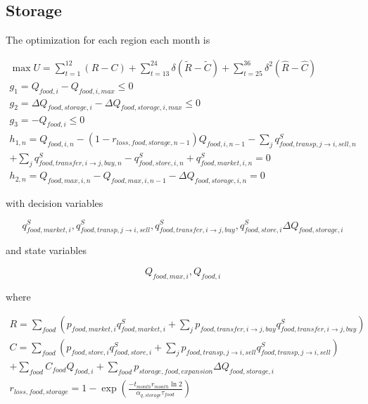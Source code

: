 \documentclass[letter,12pt]{article}
\begin{document}
\subsection{Storage}

The optimization for each region each month is

\begin{gather}
\max U = \sum_{t=1}^{12} \left(R - C\right) + \sum_{t=13}^{24} \delta \left(\tilde{R} - \tilde{C}\right) + \sum_{t=25}^{36} \delta^2 \left(\hat{R} - \hat{C}\right) \\
g_1 = Q_{food,i} - Q_{food,i,max} \leq 0 \\
g_2 = \Delta Q_{food,storage,i} - \Delta Q_{food,storage,i,max} \leq 0 \\
g_3 = - Q_{food,i} \leq 0 \\
h_{1,n} = Q_{food,i,n} - \left(1-r_{loss,food,storage,n-1}\right) Q_{food,i,n-1} - \sum_j q_{food,transp,j \rightarrow i,sell,n}^S \nonumber \\
+ \sum_j q_{food,transfer,i \rightarrow j,buy,n}^S - q_{food,store,i,n}^S + q_{food,market,i,n}^S = 0\\
h_{2,n} = Q_{food,max,i,n} - Q_{food,max,i,n-1} - \Delta Q_{food,storage,i,n} = 0
\end{gather}

\noindent with decision variables

\begin{equation}
q_{food,market,i}^S, q_{food,transp,j \rightarrow i,sell}^S, q_{food,transfer,i \rightarrow j,buy}^S, q_{food,store,i}^S \Delta Q_{food,storage,i}
\end{equation}

\noindent and state variables

\begin{equation}
Q_{food,max,i}, Q_{food,i}
\end{equation}

\noindent where

\begin{gather}
R = \sum_{food} \left(p_{food,market,i} q_{food,market,i}^S + \sum_j p_{food,transfer,i \rightarrow j,buy} q_{food,transfer,i \rightarrow j,buy}^S \right) \\
C = \sum_{food} \left( p_{food,store,i} q_{food,store,i}^S + \sum_j p_{food,transp,j \rightarrow i,sell} q_{food,transp,j \rightarrow i,sell}^S \right) \nonumber \\
+ \sum_{food} C_{food} Q_{food,i} + \sum_{food} p_{storage,food,expansion} \Delta Q_{food,storage,i} \\
r_{loss,food,storage} = 1 - \exp \left( \frac{- t_{month} r_{month} \ln 2}{\alpha_{q,storage} \tau_{food}}\right)
\end{gather}
\end{document}
